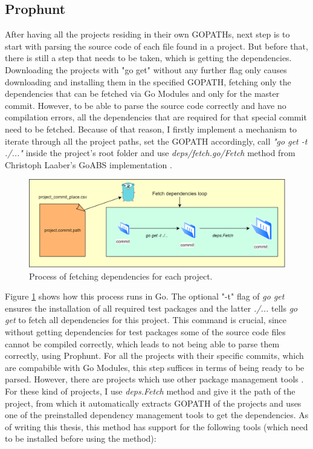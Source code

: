 \documentclass{seal_thesis}
\begin{document}
\subsection{Prophunt}
\label{Prophunt}
After having all the projects residing in their own GOPATHs, next step is to start with parsing the source code of each file found in a project. But before that, there is still a step that needs to be taken, which is getting the dependencies. Downloading the projects with "go get" without any further flag only causes downloading and installing them in the specified GOPATH, fetching only the dependencies that can be fetched via Go Modules and only for the master commit. However, to be able to parse the source code correctly and have no compilation errors, all the dependencies that are required for that special commit need to be fetched. Because of that reason, I firstly implement a mechanism to iterate through all the project paths, set the GOPATH accordingly, call \textit{"go get -t ./..."} inside the project's root folder and use \textit{deps/fetch.go/Fetch} method from Christoph Laaber's GoABS implementation \cite{sealuzh/goabs}.

\begin{figure}[H]
	\centering
	\includegraphics[width=\linewidth]{fetchdeps}
	\caption{Process of fetching dependencies for each project.}
	\label{fig:fetchdeps}
\end{figure}

\noindent Figure \ref{fig:fetchdeps} shows how this process runs in Go. The optional "-t" flag of \textit{go get} ensures the installation of all required test packages and the latter \textit{./...} tells \textit{go get} to fetch all dependencies for this project. This command is crucial, since without getting dependencies for test packages some of the source code files cannot be compiled correctly, which leads to not being able to parse them correctly, using Prophunt. For all the projects with their specific commits, which are compabible with Go Modules, this step suffices in terms of being ready to be parsed. However, there are projects which use other package management tools \cite{packagemanagement}. For these kind of projects, I use \textit{deps.Fetch} method and give it the path of the project, from which it automatically extracts GOPATH of the projects and uses one of the preinstalled dependency management tools to get the dependencies. As of writing this thesis, this method has support for the following tools (which need to be installed before using the method):
\end{document}
